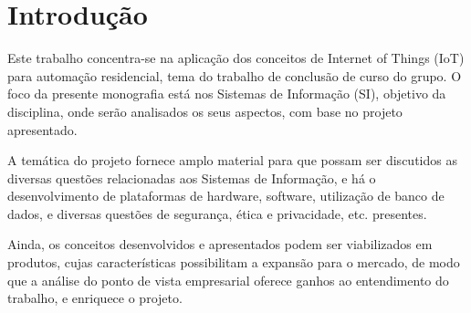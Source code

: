 \chapter{Introdução}

Este trabalho concentra-se na aplicação dos conceitos de Internet of Things (IoT) para automação residencial, tema do trabalho de conclusão de curso do grupo. O foco da presente monografia está nos Sistemas de Informação (SI), objetivo da disciplina, onde serão analisados os seus aspectos, com base no projeto apresentado.

A temática do projeto fornece amplo material para que possam ser discutidos as diversas questões relacionadas aos Sistemas de Informação, e há o desenvolvimento de plataformas de hardware, software, utilização de banco de dados, e diversas questões de segurança, ética e privacidade, etc. presentes.

Ainda, os conceitos desenvolvidos e apresentados podem ser viabilizados em produtos, cujas características possibilitam a expansão para o mercado, de modo que a análise do ponto de vista empresarial oferece ganhos ao entendimento do trabalho, e enriquece o projeto.
